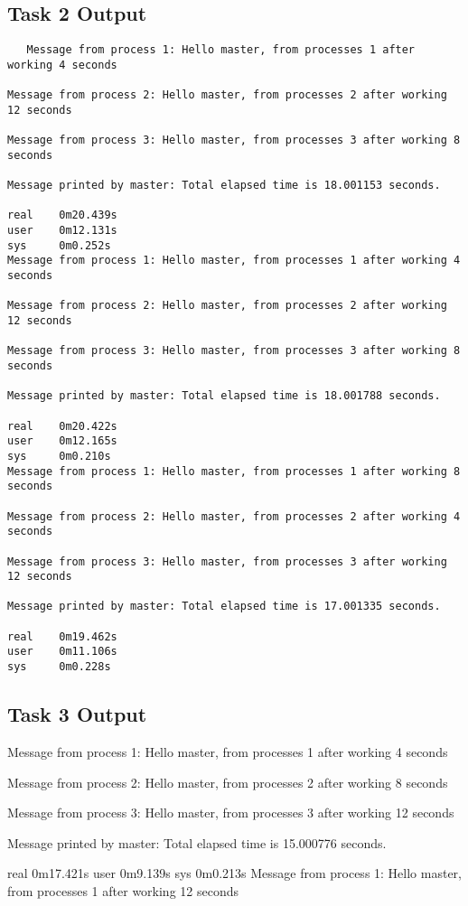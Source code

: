 \documentclass[11pt]{article}
\begin{document}
\subsection{Task 2 Output}
\label{sec:org901b3f8}
\begin{verbatim}
   Message from process 1: Hello master, from processes 1 after working 4 seconds

Message from process 2: Hello master, from processes 2 after working 12 seconds

Message from process 3: Hello master, from processes 3 after working 8 seconds

Message printed by master: Total elapsed time is 18.001153 seconds.

real    0m20.439s
user    0m12.131s
sys     0m0.252s
Message from process 1: Hello master, from processes 1 after working 4 seconds

Message from process 2: Hello master, from processes 2 after working 12 seconds

Message from process 3: Hello master, from processes 3 after working 8 seconds

Message printed by master: Total elapsed time is 18.001788 seconds.

real    0m20.422s
user    0m12.165s
sys     0m0.210s
Message from process 1: Hello master, from processes 1 after working 8 seconds

Message from process 2: Hello master, from processes 2 after working 4 seconds

Message from process 3: Hello master, from processes 3 after working 12 seconds

Message printed by master: Total elapsed time is 17.001335 seconds.

real    0m19.462s
user    0m11.106s
sys     0m0.228s
\end{verbatim}
\subsection{Task 3 Output}
\label{sec:org6d187aa}
Message from process 1: Hello master, from processes 1 after working 4 seconds

Message from process 2: Hello master, from processes 2 after working 8 seconds

Message from process 3: Hello master, from processes 3 after working 12 seconds

Message printed by master: Total elapsed time is 15.000776 seconds.

real    0m17.421s
user    0m9.139s
sys     0m0.213s
Message from process 1: Hello master, from processes 1 after working 12 seconds
\end{document}
